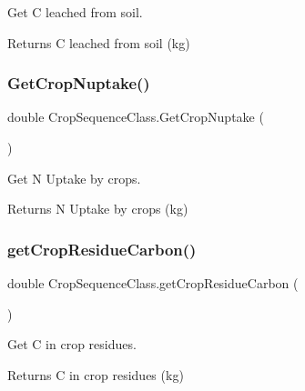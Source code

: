 Get C leached from soil. 

\begin{DoxyReturn}{Returns}
C leached from soil (kg) 
\end{DoxyReturn}
\mbox{\label{class_crop_sequence_class_a92d2f8335cb4f16506d5087e0ab58622}} 
\subsubsection{\texorpdfstring{GetCropNuptake()}{GetCropNuptake()}}
{\footnotesize\ttfamily double Crop\+Sequence\+Class.\+Get\+Crop\+Nuptake (\begin{DoxyParamCaption}{ }\end{DoxyParamCaption})\hspace{0.3cm}{\ttfamily [inline]}}



Get N Uptake by crops. 

\begin{DoxyReturn}{Returns}
N Uptake by crops (kg) 
\end{DoxyReturn}
\mbox{\label{class_crop_sequence_class_aa75f44fa8e749c2f59010972c2956dc7}} 
\subsubsection{\texorpdfstring{getCropResidueCarbon()}{getCropResidueCarbon()}}
{\footnotesize\ttfamily double Crop\+Sequence\+Class.\+get\+Crop\+Residue\+Carbon (\begin{DoxyParamCaption}{ }\end{DoxyParamCaption})\hspace{0.3cm}{\ttfamily [inline]}}



Get C in crop residues. 

\begin{DoxyReturn}{Returns}
C in crop residues (kg) 
\end{DoxyReturn}
\mbox{\label{class_crop_sequence_class_ad153a07bfea03b639bfa702d109ec759}} 
